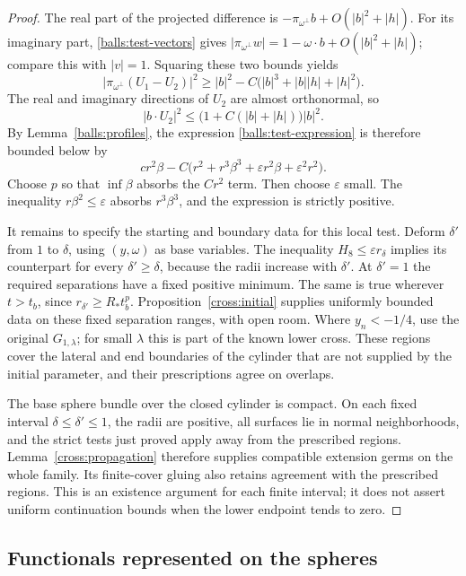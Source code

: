 \documentclass[11pt]{article}
\theoremstyle{definition}
\theoremstyle{remark}
\numberwithin{equation}{section}
\begin{document}
\begin{proof}
The real part of the projected difference is
$-\pi_{\omega^\perp}b+O(|b|^2+|h|)$.  For its imaginary part,
\eqref{balls:test-vectors} gives
$|\pi_{\omega^\perp}w|=1-\omega\cdot b+O(|b|^2+|h|)$;
compare this with $|v|=1$.  Squaring these two bounds yields
\[
 |\pi_{\omega^\perp}(U_1-U_2)|^2
 \geq |b|^2-C\bigl(|b|^3+|b||h|+|h|^2\bigr).
\]
The real and imaginary directions of $U_2$ are almost orthonormal, so
\[
 |b\cdot U_2|^2\leq
       \bigl(1+C(|b|+|h|)\bigr)|b|^2.
\]
By Lemma~\ref{balls:profiles}, the expression
\eqref{balls:test-expression} is therefore bounded below by
\[
 c r^2\beta
  -C\bigl(r^2+r^3\beta^3+\varepsilon r^2\beta
                       +\varepsilon^2r^2\bigr).
\]
Choose $p$ so that $\inf\beta$ absorbs the $Cr^2$ term.  Then choose
$\varepsilon$ small.  The inequality $r\beta^2\leq\varepsilon$ absorbs
$r^3\beta^3$, and the expression is strictly positive.

It remains to specify the starting and boundary data for this local
test.  Deform $\delta'$ from $1$ to $\delta$, using $(y,\omega)$ as base
variables.  The inequality $H_8\leq\varepsilon r_\delta$ implies its
counterpart for every $\delta'\geq\delta$, because the radii increase
with $\delta'$.  At $\delta'=1$ the required separations have a fixed
positive minimum.  The same is true wherever $t>t_b$, since
$r_{\delta'}\geq R_*t_b^p$.  Proposition~\ref{cross:initial} supplies
uniformly bounded data on these fixed separation ranges, with open room.
Where $y_n<-1/4$, use the original $G_{1,\lambda}$; for small $\lambda$
this is part of the known lower cross.  These regions cover the lateral
and end boundaries of the cylinder that are not supplied by the initial
parameter, and their prescriptions agree on overlaps.

The base sphere bundle over the closed cylinder is compact.  On each
fixed interval $\delta\leq\delta'\leq1$, the radii are positive, all
surfaces lie in normal neighborhoods, and the strict tests just proved
apply away from the prescribed regions.  Lemma~\ref{cross:propagation}
therefore supplies compatible extension germs on the whole family.
Its finite-cover gluing also retains agreement with the prescribed
regions.  This is an existence argument for each finite interval; it
does not assert uniform continuation bounds when the lower endpoint
tends to zero.
\end{proof}

\subsection{Functionals represented on the spheres}
\end{document}
